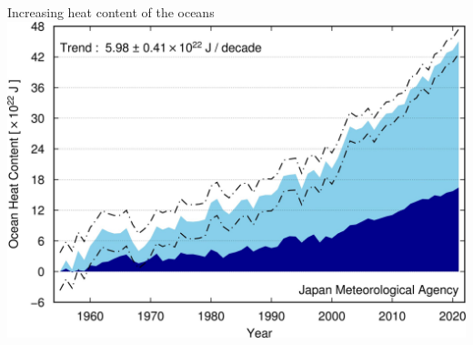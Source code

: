 \begin{frame}
\begin{scriptsize}
\begin{columns}
      \begin{center}
        {\scriptsize \cb Increasing heat content of the oceans}
          \includegraphics[width=1.0\textwidth]{plots/JMO_sea_heat}
      \end{center}      
    \end{columns}

  \end{scriptsize}
  \end{frame}
